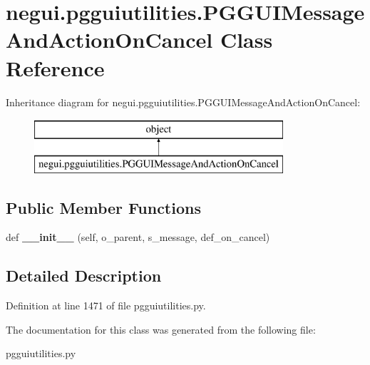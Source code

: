 \hypertarget{classnegui_1_1pgguiutilities_1_1PGGUIMessageAndActionOnCancel}{}\section{negui.\+pgguiutilities.\+P\+G\+G\+U\+I\+Message\+And\+Action\+On\+Cancel Class Reference}
\label{classnegui_1_1pgguiutilities_1_1PGGUIMessageAndActionOnCancel}
Inheritance diagram for negui.\+pgguiutilities.\+P\+G\+G\+U\+I\+Message\+And\+Action\+On\+Cancel\+:\begin{figure}[H]
\begin{center}
\leavevmode
\includegraphics[height=2.000000cm]{classnegui_1_1pgguiutilities_1_1PGGUIMessageAndActionOnCancel}
\end{center}
\end{figure}
\subsection*{Public Member Functions}
\begin{DoxyCompactItemize}
\item 
def {\bfseries \+\_\+\+\_\+init\+\_\+\+\_\+} (self, o\+\_\+parent, s\+\_\+message, def\+\_\+on\+\_\+cancel)\hypertarget{classnegui_1_1pgguiutilities_1_1PGGUIMessageAndActionOnCancel_a4274202cb2f6a6ef64a3928c9d433aff}{}\label{classnegui_1_1pgguiutilities_1_1PGGUIMessageAndActionOnCancel_a4274202cb2f6a6ef64a3928c9d433aff}

\end{DoxyCompactItemize}


\subsection{Detailed Description}


Definition at line 1471 of file pgguiutilities.\+py.



The documentation for this class was generated from the following file\+:\begin{DoxyCompactItemize}
\item 
pgguiutilities.\+py\end{DoxyCompactItemize}
